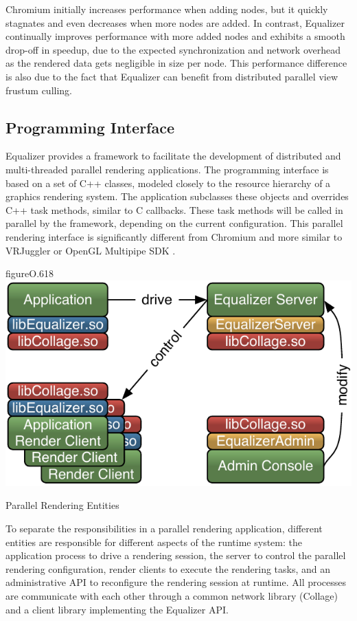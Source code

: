 Chromium initially increases performance when adding nodes, but it quickly
stagnates and even decreases when more nodes are added. In contrast, Equalizer
continually improves performance with more added nodes and exhibits a smooth
drop-off in speedup, due to the expected synchronization and network overhead
as the rendered data gets negligible in size per node. This performance
difference is also due to the fact that Equalizer can benefit from distributed
parallel view frustum culling.


\subsection{Programming Interface}

Equalizer provides a framework to facilitate the development of distributed and
multi-threaded parallel rendering applications. The programming interface is
based on a set of C++ classes, modeled closely to the resource hierarchy of a
graphics rendering system. The application subclasses these objects and
overrides C++ task methods, similar to C callbacks. These task methods will be
called in parallel by the framework, depending on the current configuration.
This parallel rendering interface is significantly different from Chromium
\cite{HHNFAKK:02} and more similar to VRJuggler \cite{BJHMBC:01} or OpenGL
Multipipe SDK \cite{BRE:05}.

\begin{wrapfloat}{figure}{O}{.618\textwidth}
 \includegraphics[width=.618\textwidth]{images/processes}
 {\caption{\label{fProcessing}Parallel Rendering Entities}}
\end{wrapfloat}

To separate the responsibilities in a parallel rendering application, different
entities are responsible for different aspects of the runtime system: the
application process to drive a rendering session, the server to control the
parallel rendering configuration, render clients to execute the rendering
tasks, and an administrative API to reconfigure the rendering session at
runtime. All processes are communicate with each other through a common network library (Collage) and a client library implementing the Equalizer API.

